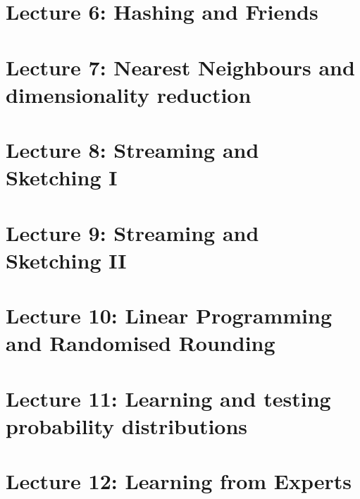 \documentclass[a4paper]{tufte-book}
\begin{document}
\chapter{Lecture 6: Hashing and Friends}


\chapter{Lecture 7: Nearest Neighbours and dimensionality reduction}


\chapter{Lecture 8: Streaming and Sketching I}


\chapter{Lecture 9: Streaming and Sketching II}


\chapter{Lecture 10: Linear Programming and Randomised Rounding}


\chapter{Lecture 11: Learning and testing probability distributions}


\chapter{Lecture 12: Learning from Experts}




\end{document}
